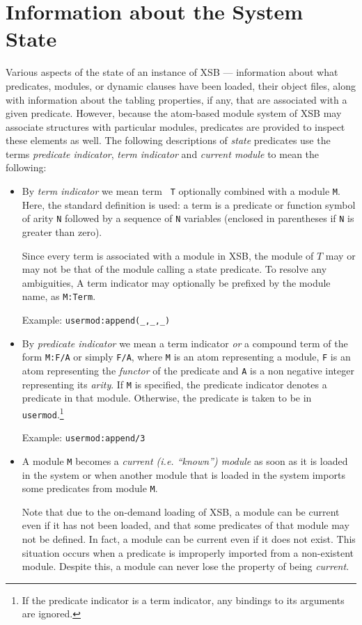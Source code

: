 \section{Information about the System State} \label{State}
 

Various aspects of the state of an instance of XSB --- information
about what predicates, modules, or dynamic clauses have been loaded,
their object files, along with information about the tabling
properties, if any, that are associated with a given predicate.
However, because the atom-based module system of XSB may associate
structures with particular modules, predicates are provided to inspect
these elements as well.  The following descriptions of {\em state}
predicates use the terms {\em predicate indicator}, {\em term
  indicator} and {\em current module} to mean the following:
 
\begin{itemize}
\item By {\em term indicator}  we mean term {\tt
  T} optionally combined with a module {\tt M}.  Here, the standard
  definition is used: a term is a predicate or function symbol of
  arity {\tt N} followed by a sequence of {\tt N} variables (enclosed
  in parentheses if {\tt N} is greater than zero).

  Since every term is associated with a module in XSB, the module of
  $T$ may or may not be that of the module calling a state predicate.
  To resolve any ambiguities, A term indicator may optionally be
  prefixed by the module name, as {\tt M:Term}.

  Example: {\tt usermod:append(\_,\_,\_)}
\item By {\em predicate indicator}  we mean
  a term indicator {\em or} a compound term of the form {\tt M:F/A} or
  simply {\tt F/A}, where {\tt M} is an atom representing a module,
  {\tt F} is an atom representing the {\em functor} of the predicate
  and {\tt A} is a non negative integer representing its {\em arity}.
  If {\tt M} is specified, the predicate indicator denotes a predicate
  in that module.  Otherwise, the predicate is taken to be in {\tt
    usermod}.\footnote{If the predicate indicator is a term indicator,
    any bindings to its arguments are ignored.}

      Example: {\tt usermod:append/3}
\item A module {\tt M} becomes a {\em current (i.e. ``known'') module} as
      soon as it is loaded in the system or when another module that is
      loaded in the system imports some predicates from module {\tt M}.

      Note that due to the on-demand loading of XSB, a module can be
      current even if it has not been loaded, and that some predicates
      of that module may not be defined. In fact, a module can be
      current even if it does not exist.  This situation occurs when a
      predicate is improperly imported from a non-existent module.
      Despite this, a module can never lose the property of being {\em
        current}.
\end{itemize}

